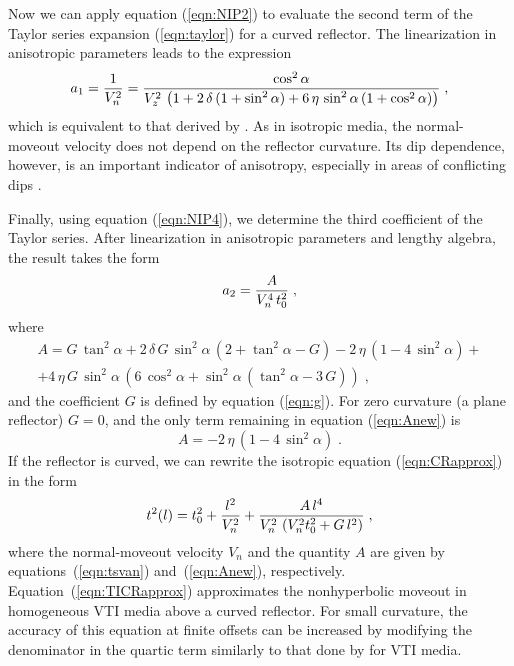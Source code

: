 \par
Now we can apply equation (\ref{eqn:NIP2}) to evaluate the second term of the
Taylor series expansion (\ref{eqn:taylor}) for a curved
reflector. The linearization in anisotropic parameters leads to the expression
\begin{equation}
a_1 = {1 \over V_n^2} = 
{\cos^2{\alpha} \over {V_z^2\,
\left(1 + 2\,\delta\,(1 + \sin^2{\alpha}) + 
6\,\eta\,\sin^2{\alpha}\,(1+\cos^2{\alpha})\right)}}\;,
\label{eqn:tsvan}
\end{equation}
which is equivalent to that derived by \cite{tsvan1995}. As in
isotropic media, the normal-moveout velocity does not depend on the
reflector curvature. Its dip dependence, however, is an important
indicator of anisotropy, especially in areas of conflicting dips
\cite[]{aktsvan}.  \par Finally, using equation (\ref{eqn:NIP4}), we
determine the third coefficient of the Taylor series. After
linearization in anisotropic parameters and lengthy algebra, the
result takes the form
\begin{equation}
a_2 = {A \over {V_n^4\,t_0^2}}\;,
\label{eqn:a2new}
\end{equation}
where
\begin{eqnarray}
A = G\,\tan^2{\alpha} + 
2\,\delta\,G\,\sin^2{\alpha}\,(2 + \tan^2{\alpha} - G) -
2\,\eta\,(1 - 4\,\sin^2{\alpha}) +
\nonumber \\
+ 4\,\eta\,G\,\sin^2{\alpha}\,\left(
6\,\cos^2{\alpha} + \sin^2{\alpha}\,(\tan^2{\alpha}-3\,G)\right)\;,
\label{eqn:Anew}
\end{eqnarray}
and the coefficient $G$ is defined by equation (\ref{eqn:g}). For zero curvature (a plane reflector) $G = 0$, and
the only term remaining in equation (\ref{eqn:Anew}) is
\begin{equation}
A = - 2\,\eta\,(1 - 4\,\sin^2{\alpha})\;.
\label{eqn:zerog}
\end{equation}
If the reflector is curved, we can rewrite the
isotropic equation (\ref{eqn:CRapprox}) in the form
\begin{equation}
t^2(l) = t_0^2 + {l^2 \over V_n^2} + {{A\,l^4} \over 
{V_n^2\,\left(V_n^2 t_0^2 + G\,l^2\right)}}\;,
\label{eqn:TICRapprox}
\end{equation}
where the normal-moveout velocity $V_n$ and the quantity $A$ are given by 
equations~(\ref{eqn:tsvan}) and~(\ref{eqn:Anew}), respectively. 
Equation~(\ref{eqn:TICRapprox}) approximates the nonhyperbolic moveout 
in homogeneous VTI media above a curved reflector. For small
curvature, the accuracy of this equation at finite offsets
can be increased by modifying the denominator in the quartic term  similarly
to that done by \cite{grektsvan} for VTI media.
